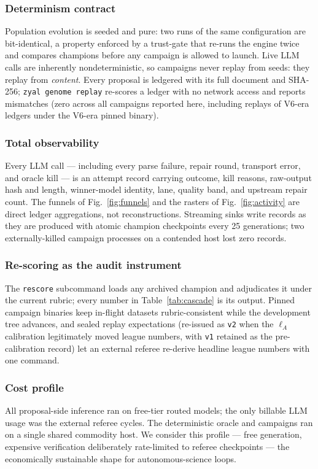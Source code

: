\documentclass[journal]{IEEEtran}
\newcommand{\lA}{\ell_A}
\begin{document}
\subsubsection{Determinism contract} Population evolution is seeded and pure: two runs
of the same configuration are bit-identical, a property enforced by a trust-gate that
re-runs the engine twice and compares champions before any campaign is allowed to
launch. Live LLM calls are inherently nondeterministic, so campaigns never replay from
seeds: they replay from \emph{content}. Every proposal is ledgered with its full
document and SHA-256; \texttt{zyal genome replay} re-scores a ledger with no network
access and reports mismatches (zero across all campaigns reported here, including
replays of V6-era ledgers under the V6-era pinned binary).

\subsubsection{Total observability} Every LLM call --- including every parse failure,
repair round, transport error, and oracle kill --- is an attempt record carrying outcome,
kill reasons, raw-output hash and length, winner-model identity, lane, quality band, and
upstream repair count. The funnels of Fig.~\ref{fig:funnels} and the rasters of
Fig.~\ref{fig:activity} are direct ledger aggregations, not reconstructions. Streaming
sinks write records as they are produced with atomic champion checkpoints every 25
generations; two externally-killed campaign processes on a contended host lost zero
records.

\subsubsection{Re-scoring as the audit instrument} The \texttt{rescore} subcommand
loads any archived champion and adjudicates it under the current rubric; every number in
Table~\ref{tab:cascade} is its output. Pinned campaign binaries keep in-flight datasets
rubric-consistent while the development tree advances, and sealed replay expectations
(re-issued as \texttt{v2} when the $\lA$ calibration legitimately moved league
numbers, with \texttt{v1} retained as the pre-calibration record) let an external
referee re-derive headline league numbers with one command.

\subsubsection{Cost profile} All proposal-side inference ran on free-tier routed
models; the only billable LLM usage was the external referee cycles. The deterministic
oracle and campaigns ran on a single shared commodity host. We consider this profile ---
free generation, expensive verification deliberately rate-limited to referee
checkpoints --- the economically sustainable shape for autonomous-science loops.
\end{document}
